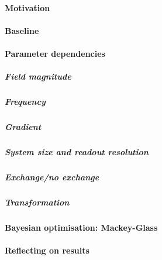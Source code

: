 \paragraph{Motivation} %
\paragraph{Baseline}
\paragraph{Parameter dependencies}
\subparagraph{Field magnitude}
\subparagraph{Frequency}
\subparagraph{Gradient}
\subparagraph{System size and readout resolution}
\subparagraph{Exchange/no exchange}
\subparagraph{Transformation}
\paragraph{Bayesian optimisation: Mackey-Glass}
\paragraph{Reflecting on results} %

